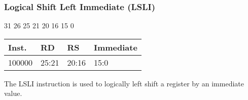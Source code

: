 \documentclass[12pt]{article}
\begin{document}



    \newpage
    \subsubsection{Logical Shift Left Immediate (LSLI)}
    
    \hspace{1.6cm}31 \hspace{1.15cm}26 \hspace{.05cm}25 \hspace{.8cm}21 \hspace{.05cm}20 \hspace{.8cm}16 \hspace{.05cm}15 \hspace{6.4cm}0
    \vspace{-.25cm}
    \begin{center}
        \begin{tabular}{ |p{1.8cm}|p{1.5cm}|p{1.5cm}|p{6.8cm}| }
            \hline
            \textbf{Inst.} & \textbf{RD} &  \textbf{RS} & \textbf{Immediate}\\
            \hline
            100000& 25:21 & 20:16 &15:0\\
            \hline
        \end{tabular}
    \end{center}
    
    \noindent
    The LSLI instruction is used to logically left shift a register by an immediate value. 
    
\end{document}
